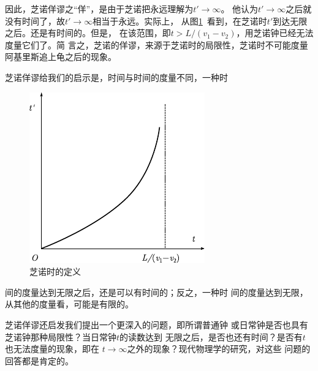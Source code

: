 因此，芝诺佯谬之“佯”，是由于芝诺把永远理解为$t'\rightarrow\infty$。
他认为$t'\rightarrow\infty$之后就没有时间了，故$t'\rightarrow\infty$相当于永远。实际上，
从图\ref{fig:01.03}~看到，在芝诺时$ t' $到达无限之后。还是有时间的。但是，
在该范围，即$ t>L/\left(v_1-v_2\right) $，用芝诺钟已经无法度量它们了。简
言之，芝诺的佯谬，来源于芝诺时的局限性，芝诺时不可能度量
阿基里斯追上龟之后的现象。

芝诺佯谬给我们的启示是，时间与时间的度量不同，一种时\clearpage
\begin{figure}
    \includegraphics{figure/fig01.03}
    \caption{芝诺时的定义}
    \label{fig:01.03}
\end{figure}
\noindent 间的度量达到无限之后，还是可以有时间的；反之，一种时
间的度量达到无限，从其他的度量看，可能是有限的。

芝诺佯谬还启发我们提出一个更深入的问题，即所谓普通钟
或日常钟是否也具有芝诺钟那种局限性？当日常钟$t$的读数达到
无限之后，是否也还有时间？是否有$t$也无法度量的现象，即在
$t\rightarrow\infty$之外的现象？现代物理学的研究，对这些
问题的回答都是肯定的。
